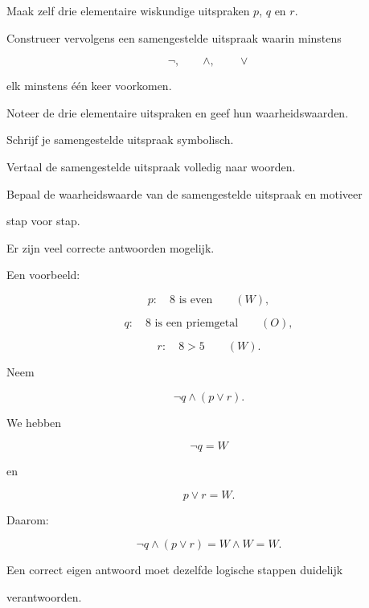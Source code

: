\documentclass{ximera}
\begin{document}
\begin{oefening}{\oefG}

Maak zelf drie elementaire wiskundige uitspraken $p$, $q$ en $r$.

Construeer vervolgens een samengestelde uitspraak waarin minstens

\[
\neg,\qquad\land,\qquad\lor
\]

elk minstens één keer voorkomen.

\begin{question}

Noteer de drie elementaire uitspraken en geef hun waarheidswaarden.

\end{question}



\begin{question}

Schrijf je samengestelde uitspraak symbolisch.

\end{question}



\begin{question}

Vertaal de samengestelde uitspraak volledig naar woorden.

\end{question}



\begin{question}

Bepaal de waarheidswaarde van de samengestelde uitspraak en motiveer

stap voor stap.

\end{question}



\begin{oplossing}

Er zijn veel correcte antwoorden mogelijk.

Een voorbeeld:

\[
p:\quad 8\text{ is even}\qquad(W),
\]

\[
q:\quad 8\text{ is een priemgetal}\qquad(O),
\]

\[
r:\quad 8>5\qquad(W).
\]

Neem

\[
\neg q\land(p\lor r).
\]

We hebben

\[
\neg q=W
\]

en

\[
p\lor r=W.
\]

Daarom:

\[
\neg q\land(p\lor r)
=
W\land W
=
W.
\]

Een correct eigen antwoord moet dezelfde logische stappen duidelijk

verantwoorden.

\end{oplossing}

\end{oefening}
\end{document}

